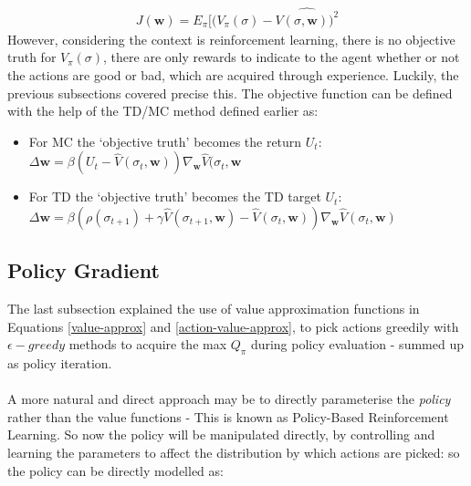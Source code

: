 \documentclass[ %
                    author={Ashwinder Khurana},
                supervisor={Prof Dave Cliff},
                    degree={MEng},
                     title={The Deeply Reinforced Trader},
                  subtitle={},
                      type={enterprise},
                      year={2020} ]{dissertation}
\begin{document}
{\begin{equation}
\label{MSE-supervised}
\begin{split}
J(\textbf{w}) = E_\pi[(V_\pi(\sigma) - \hat{V(\sigma, \textbf{w}))^{2}}
\end{split}
\end{equation}
\noindent
However, considering the context is reinforcement learning, there is no objective truth for $V_\pi(\sigma)$, there are only rewards to indicate to the agent whether or not the actions are good or bad, which are acquired through experience. 
Luckily, the previous subsections covered precise this. The objective function can be defined with the help of the TD/MC method defined earlier as:
\begin{itemize}
\item For MC the \enquote*{objective truth} becomes the return $U_t$: $\Delta \textbf{w} = \beta(U_t - \hat{V}(\sigma_t, \textbf{w})) \nabla_\textbf{w} \hat{V}(\sigma_t, \textbf{w}$
\item For TD the \enquote*{objective truth} becomes the TD target $U_t$: $\Delta \textbf{w} = \beta(\rho(\sigma_{t+1}) + \gamma\hat{V}(\sigma_{t+1}, \textbf{w}) - \hat{V}(\sigma_t, \textbf{w})) \nabla_\textbf{w} \hat{V}(\sigma_t, \textbf{w})$
\end{itemize}

\subsection{Policy Gradient}
\label{subsection:Policy Gradient}
The last subsection explained the use of value approximation functions in Equations \ref{value-approx} and \ref{action-value-approx}, to pick actions greedily with $\epsilon-greedy$ methods to acquire the max $Q_\pi$ during policy evaluation - summed up as policy iteration. 
\\
\\
A more natural and direct approach may be to directly parameterise the \textit{policy} rather than the value functions - This is known as Policy-Based Reinforcement Learning. So now the policy will be manipulated directly, by controlling and learning the parameters to affect the distribution by which actions are picked: so the policy can be directly modelled as:

}
\end{document}
